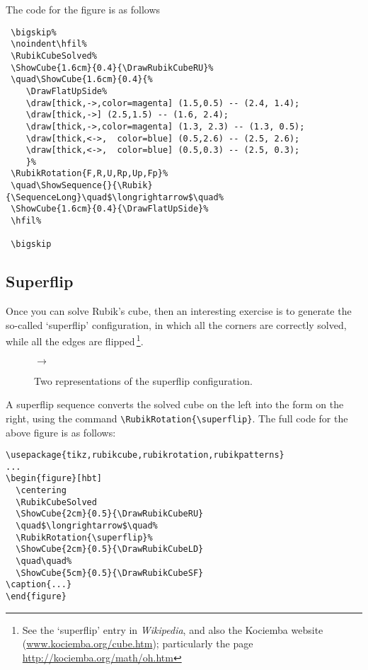 \documentclass[a4paper]{article}
\begin{document}
 \bigskip%


{\noindent}The code for the figure is as follows 


\begin{verbatim}
 \bigskip%
 \noindent\hfil%
 \RubikCubeSolved%
 \ShowCube{1.6cm}{0.4}{\DrawRubikCubeRU}%
 \quad\ShowCube{1.6cm}{0.4}{%
    \DrawFlatUpSide%
    \draw[thick,->,color=magenta] (1.5,0.5) -- (2.4, 1.4);
    \draw[thick,->] (2.5,1.5) -- (1.6, 2.4);
    \draw[thick,->,color=magenta] (1.3, 2.3) -- (1.3, 0.5);
    \draw[thick,<->,  color=blue] (0.5,2.6) -- (2.5, 2.6);
    \draw[thick,<->,  color=blue] (0.5,0.3) -- (2.5, 0.3);
    }%
 \RubikRotation{F,R,U,Rp,Up,Fp}%
 \quad\ShowSequence{}{\Rubik}{\SequenceLong}\quad$\longrightarrow$\quad%
 \ShowCube{1.6cm}{0.4}{\DrawFlatUpSide}%
 \hfil%
 
 \bigskip
\end{verbatim}





\pagebreak
\subsection{Superflip}


Once you can solve Rubik's cube, then an interesting exercise  is to generate  
the so-called `superflip' configuration, in which all the 
corners are correctly solved, while all the edges are 
flipped\,\footnote{See the `superflip' entry in \textit{Wikipedia}, and also 
the Kociemba website (\url{www.kociemba.org/cube.htm}); particularly the page 
\url{http://kociemba.org/math/oh.htm}}.

\begin{figure}[hbt]
  \centering
  \RubikCubeSolved
  \quad$\longrightarrow$\quad%
  \RubikRotation{\superflip}%
  \quad\quad%
\caption{Two representations of the superflip configuration.}
\end{figure}

{\noindent}A superflip sequence converts the solved cube on the left 
into the form on the right, using the command \verb!\RubikRotation{\superflip}!.
The full code for the above figure is as follows:
\begin{verbatim}
\usepackage{tikz,rubikcube,rubikrotation,rubikpatterns}
...
\begin{figure}[hbt]
  \centering
  \RubikCubeSolved
  \ShowCube{2cm}{0.5}{\DrawRubikCubeRU}
  \quad$\longrightarrow$\quad%
  \RubikRotation{\superflip}%
  \ShowCube{2cm}{0.5}{\DrawRubikCubeLD}
  \quad\quad%
  \ShowCube{5cm}{0.5}{\DrawRubikCubeSF}
\caption{...}
\end{figure}
\end{verbatim}
\end{document}
